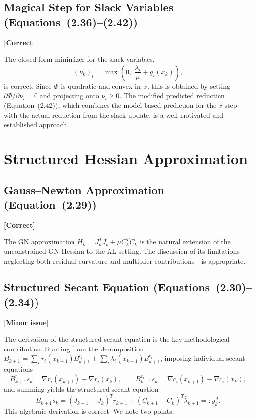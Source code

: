 \documentclass[11pt]{article}
\newcommand{\statusok}{\textcolor{okcolor}{\textbf{[Correct]}}}
\newcommand{\statuswarn}{\textcolor{warncolor}{\textbf{[Minor issue]}}}
\theoremstyle{plain}
\begin{document}
\subsection{Magical Step for Slack Variables (Equations~(2.36)--(2.42))}
\statusok

The closed-form minimizer for the slack variables,
\[
(\hat{\nu}_k)_i = \max\!\left(0,\;\frac{\lambda_i}{\mu} + g_i(\bar{x}_k)\right),
\]
is correct. Since $\Phi$ is quadratic and convex in~$\nu$, this is obtained by setting $\partial\Phi/\partial\nu_i = 0$ and projecting onto $\nu_i \ge 0$. The modified predicted reduction (Equation~(2.42)), which combines the model-based prediction for the $x$-step with the actual reduction from the slack update, is a well-motivated and established approach.

\section{Structured Hessian Approximation}

\subsection{Gauss--Newton Approximation (Equation~(2.29))}
\statusok

The GN approximation $H_k = J_k^TJ_k + \mu C_k^TC_k$ is the natural extension of the unconstrained GN Hessian to the AL setting. The discussion of its limitations---neglecting both residual curvature and multiplier contributions---is appropriate.

\subsection{Structured Secant Equation (Equations~(2.30)--(2.34))}
\statuswarn

The derivation of the structured secant equation is the key methodological contribution. Starting from the decomposition $B_{k+1} = \sum_i r_i(x_{k+1})B_{k+1}^{r_i} + \sum_i \bar{\lambda}_i(x_{k+1})B_{k+1}^{c_i}$, imposing individual secant equations
\[
B_{k+1}^{r_i}s_k = \nabla r_i(x_{k+1}) - \nabla r_i(x_k), \qquad B_{k+1}^{c_i}s_k = \nabla c_i(x_{k+1}) - \nabla c_i(x_k),
\]
and summing yields the structured secant equation
\[
B_{k+1}s_k = (J_{k+1} - J_k)^Tr_{k+1} + (C_{k+1} - C_k)^T\bar{\lambda}_{k+1} =: y_k^A.
\]
This algebraic derivation is correct. We note two points.
\end{document}
